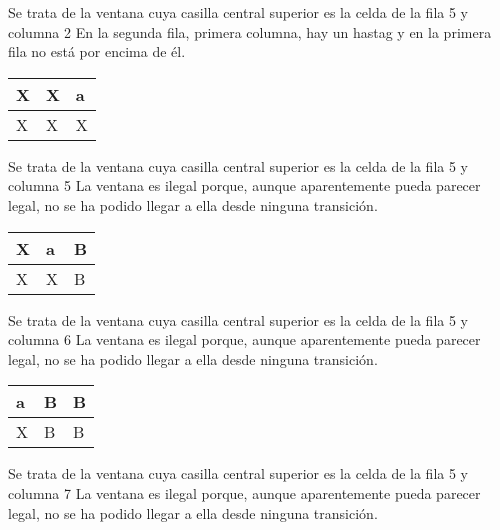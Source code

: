﻿\documentclass[a4paper,10pt]{article}
\begin{document}
Se trata de la ventana cuya casilla central superior es la celda de la fila 5 y columna 2\newline
En la segunda fila, primera columna, hay un hastag y en la primera fila no está por encima de él.\newline
\begin{table}[h!]
\centering
\begin{tabular}{|l|l|l|}
\hline
	X   &   X   &   a	\\ \hline
	X   &   X   &   X	\\ \hline
\end{tabular}
\end{table}

Se trata de la ventana cuya casilla central superior es la celda de la fila 5 y columna 5\newline
La ventana es ilegal porque, aunque aparentemente pueda parecer legal, no se ha podido llegar a ella desde ninguna transición.\newline
\begin{table}[h!]
\centering
\begin{tabular}{|l|l|l|}
\hline
	X   &   a   &   B	\\ \hline
	X   &   X   &   B	\\ \hline
\end{tabular}
\end{table}

Se trata de la ventana cuya casilla central superior es la celda de la fila 5 y columna 6\newline
La ventana es ilegal porque, aunque aparentemente pueda parecer legal, no se ha podido llegar a ella desde ninguna transición.\newline
\begin{table}[h!]
\centering
\begin{tabular}{|l|l|l|}
\hline
	a   &   B   &   B	\\ \hline
	X   &   B   &   B	\\ \hline
\end{tabular}
\end{table}

Se trata de la ventana cuya casilla central superior es la celda de la fila 5 y columna 7\newline
La ventana es ilegal porque, aunque aparentemente pueda parecer legal, no se ha podido llegar a ella desde ninguna transición.\newline
\end{document}
